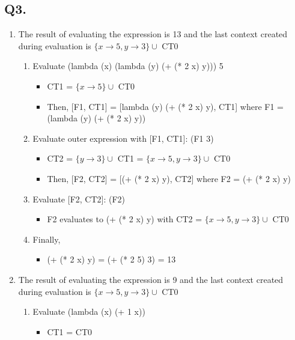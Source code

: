 \documentclass[8pt, letterpaper, titlepage]{article}
\begin{document}
\subsection*{Q3.}
\begin{enumerate}[label=(\alph*)]
  \item The result of evaluating the expression is 13 and the last context created during evaluation is $\{x \rightarrow 5, y \rightarrow 3\} \cup$ CT0
    \begin{enumerate}[label=(\roman*)]
      \item 
      Evaluate (lambda (x) (lambda (y) (+ (* 2 x) y))) 5
      \begin{itemize}
        \item CT1 = $\{x \rightarrow 5\} \cup $ CT0
        \item Then, [F1, CT1] = [lambda (y) (+ (* 2 x) y), CT1] where F1 = (lambda (y) (+ (* 2 x) y))
      \end{itemize}
      \item Evaluate outer expression with [F1, CT1]: (F1 3)
      \begin{itemize}
        \item CT2 = $\{y \rightarrow 3\} \cup $ CT1 = $\{x \rightarrow 5, y \rightarrow 3\} \cup$ CT0
        \item Then, [F2, CT2] = [(+ (* 2 x) y), CT2] where F2 = (+ (* 2 x) y)
      \end{itemize}
      \item Evaluate [F2, CT2]: (F2)
      \begin{itemize}
        \item F2 evaluates to (+ (* 2 x) y) with CT2 = $\{x \rightarrow 5, y \rightarrow 3\} \cup$ CT0
      \end{itemize}
      \item Finally, 
      \begin{itemize}
        \item (+ (* 2 x) y) = (+ (* 2 5) 3) = 13
      \end{itemize}
    \end{enumerate}
    \item The result of evaluating the expression is 9 and the last context created during evaluation is $\{x \rightarrow 5, y \rightarrow 3\} \cup$ CT0
    \begin{enumerate}[label=(\roman*)]
      \item Evaluate (lambda (x) (+ 1 x)) 
      \begin{itemize}
        \item CT1 = CT0

\end{itemize}
\end{enumerate}
\end{enumerate}
\end{document}

